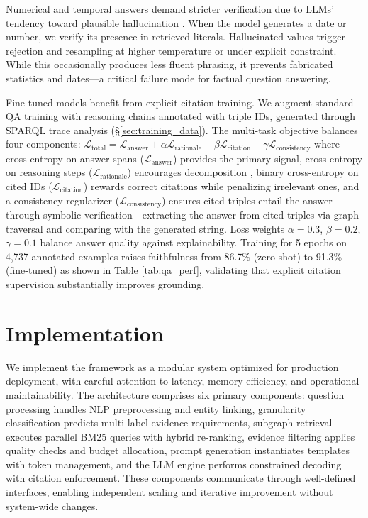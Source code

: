 \documentclass[conference]{IEEEtran}
\begin{document}
Numerical and temporal answers demand stricter verification due to LLMs' tendency toward plausible hallucination \cite{petroni2019language,press2023measuring}. When the model generates a date or number, we verify its presence in retrieved literals. Hallucinated values trigger rejection and resampling at higher temperature or under explicit constraint. While this occasionally produces less fluent phrasing, it prevents fabricated statistics and dates—a critical failure mode for factual question answering.

Fine-tuned models benefit from explicit citation training. We augment standard QA training with reasoning chains annotated with triple IDs, generated through SPARQL trace analysis (§\ref{sec:training_data}). The multi-task objective balances four components: $\mathcal{L}_{\text{total}} = \mathcal{L}_{\text{answer}} + \alpha \mathcal{L}_{\text{rationale}} + \beta \mathcal{L}_{\text{citation}} + \gamma \mathcal{L}_{\text{consistency}}$ where cross-entropy on answer spans ($\mathcal{L}_{\text{answer}}$) provides the primary signal, cross-entropy on reasoning steps ($\mathcal{L}_{\text{rationale}}$) encourages decomposition \cite{wei2022chain}, binary cross-entropy on cited IDs ($\mathcal{L}_{\text{citation}}$) rewards correct citations while penalizing irrelevant ones, and a consistency regularizer ($\mathcal{L}_{\text{consistency}}$) ensures cited triples entail the answer through symbolic verification—extracting the answer from cited triples via graph traversal and comparing with the generated string. Loss weights $\alpha=0.3$, $\beta=0.2$, $\gamma=0.1$ balance answer quality against explainability. Training for 5 epochs on 4,737 annotated examples raises faithfulness from 86.7\% (zero-shot) to 91.3\% (fine-tuned) as shown in Table \ref{tab:qa_perf}, validating that explicit citation supervision substantially improves grounding.

\section{Implementation}
\label{sec:implementation}

We implement the framework as a modular system optimized for production deployment, with careful attention to latency, memory efficiency, and operational maintainability. The architecture comprises six primary components: question processing handles NLP preprocessing and entity linking, granularity classification predicts multi-label evidence requirements, subgraph retrieval executes parallel BM25 queries with hybrid re-ranking, evidence filtering applies quality checks and budget allocation, prompt generation instantiates templates with token management, and the LLM engine performs constrained decoding with citation enforcement. These components communicate through well-defined interfaces, enabling independent scaling and iterative improvement without system-wide changes.
\end{document}
